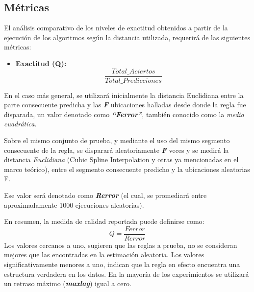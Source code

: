 \subsection{M\'etricas}
El an\'alisis comparativo de los niveles de exactitud obtenidos a partir de la ejecuci\'on de los algoritmos seg\'un la distancia utilizada, requerir\'a de las siguientes m\'etricas:
\begin{itemize}
\item \textbf{Exactitud (Q):}
\begin{equation}
 \frac{Total\_Aciertos} {Total\_Predicciones}
\end{equation}
\end{itemize}
En el caso m\'as general, se utilizar\'a inicialmente la distancia Euclidiana entre la parte consecuente predicha y las \textit{\textbf{F}} ubicaciones halladas desde donde la regla fue disparada, un valor denotado como \textit{\textbf{\enquote{Ferror}}}, tambi\'en conocido como la \textit{media cuadr\'atica}.\par
Sobre el mismo conjunto de prueba, y mediante el uso del mismo segmento consecuente de la regla, se disparar\'a aleatoriamente \textit{\textbf{F}} veces y se medir\'a la distancia \textit{Euclidiana} (Cubic Spline Interpolation y otras ya mencionadas en el marco te\'orico), entre el segmento consecuente predicho y la ubicaciones aleatorias F.\par
Ese valor ser\'a denotado como \textit{\textbf{Rerror}} (el cual, se promediar\'a entre aproximadamente 1000 ejecuciones aleatorias).\par
En resumen, la medida de calidad reportada puede definirse como: 
\begin{equation} 
Q = \frac{Ferror}{Rerror} 
\end{equation}
Los valores cercanos a uno, sugieren que las reglas a prueba, no se consideran mejores que las encontradas en la estimaci\'on aleatoria. Los valores significativamente menores a uno, indican que la regla en efecto encuentra una estructura verdadera en los datos. En la mayor\'ia de los experimientos se utilizar\'a un retraso m\'aximo (\textit{\textbf{maxlag}}) \cite{main} igual a cero.
